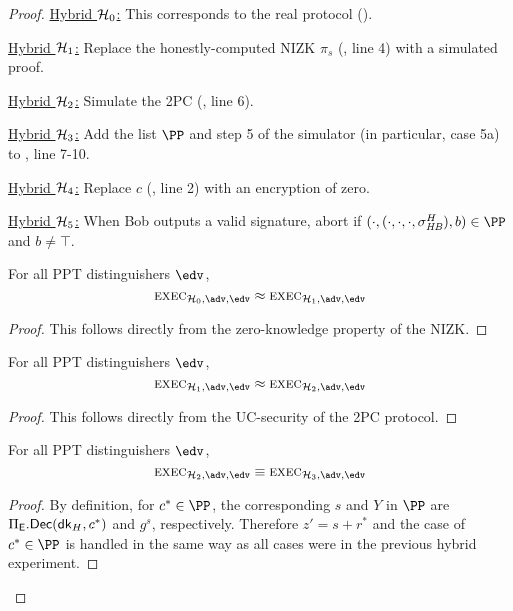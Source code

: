 \begin{proof}
\medskip


\smallskip
\noindent\underline{Hybrid $\mathcal{H}_0$:} This corresponds to the real protocol ().

\smallskip
\noindent\underline{Hybrid $\mathcal{H}_1$:} Replace the honestly-computed NIZK $\pi_s$ (, line 4) with a simulated proof.

\smallskip
\noindent\underline{Hybrid $\mathcal{H}_2$:} Simulate the 2PC (, line 6).

\smallskip
\noindent\underline{Hybrid $\mathcal{H}_3$:} Add the list $\PP$ and step 5 of the simulator (in particular, case 5a) to , line 7-10.

\smallskip
\noindent\underline{Hybrid $\mathcal{H}_4$:} Replace $c$ (, line 2) with an encryption of zero.

\smallskip
\noindent\underline{Hybrid $\mathcal{H}_5$:} When Bob outputs a valid signature, abort if $(\cdot,(\cdot,\cdot,\cdot,\sigma_\hb^H),b) \in \PP$ and $b \neq \top$.

\begin{claim}
For all PPT distinguishers $\env$,
\[
    \exec_{\hybrid_0,\adv,\env} \approx \exec_{\hybrid_1,\adv,\env}
\]
\end{claim}
\begin{proof}
This follows directly from the zero-knowledge property  of the NIZK.
\end{proof}

\begin{claim}
For all PPT distinguishers $\env$,
\[
    \exec_{\hybrid_1,\adv,\env} \approx \exec_{\hybrid_2,\adv,\env}
\]
\end{claim}
\begin{proof}
This follows directly from the UC-security of the 2PC protocol.
\end{proof}

\begin{claim}
For all PPT distinguishers $\env$,
\[
    \exec_{\hybrid_2,\adv,\env} \equiv \exec_{\hybrid_3,\adv,\env}
\]
\end{claim}
\begin{proof}
By definition, for $c^* \in \PP$, the corresponding $s$ and $Y$ in $\PP$ are $\Pi_{\mathsf{E}}.{\mathsf{Dec}}(\mathsf{dk}_H,\allowbreak c^*)$ and $g^s$, respectively. Therefore $z' = s + r^*$ and the case of $c^* \in \PP$ is handled in the same way as all cases were in the previous hybrid experiment.
\end{proof}


\end{proof}
